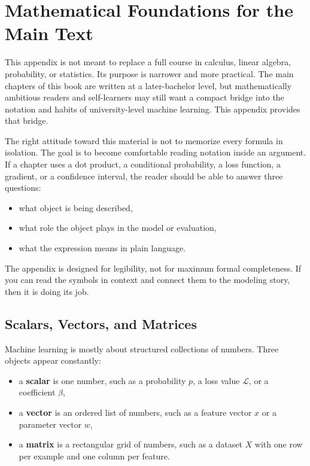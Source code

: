 \chapter{Mathematical Foundations for the Main Text}

This appendix is not meant to replace a full course in calculus, linear algebra, probability, or statistics. Its purpose is narrower and more practical. The main chapters of this book are written at a later-bachelor level, but mathematically ambitious readers and self-learners may still want a compact bridge into the notation and habits of university-level machine learning. This appendix provides that bridge.

The right attitude toward this material is not to memorize every formula in isolation. The goal is to become comfortable reading notation inside an argument. If a chapter uses a dot product, a conditional probability, a loss function, a gradient, or a confidence interval, the reader should be able to answer three questions:
\begin{itemize}[leftmargin=*]
\item what object is being described,
\item what role the object plays in the model or evaluation,
\item what the expression means in plain language.
\end{itemize}

\begin{prereqbridge}
The appendix is designed for legibility, not for maximum formal completeness. If you can read the symbols in context and connect them to the modeling story, then it is doing its job.
\end{prereqbridge}

\section{Scalars, Vectors, and Matrices}

Machine learning is mostly about structured collections of numbers. Three objects appear constantly:
\begin{itemize}[leftmargin=*]
\item a \textbf{scalar} is one number, such as a probability $p$, a loss value $\mathcal{L}$, or a coefficient $\beta$,
\item a \textbf{vector} is an ordered list of numbers, such as a feature vector $x$ or a parameter vector $w$,
\item a \textbf{matrix} is a rectangular grid of numbers, such as a dataset $X$ with one row per example and one column per feature.
\end{itemize}

